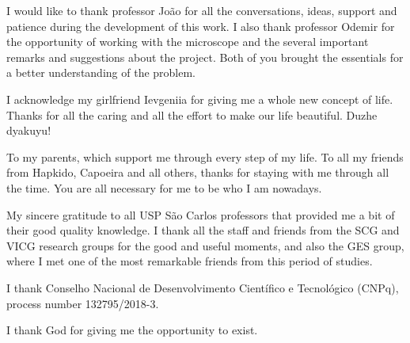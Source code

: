 I would like to thank professor João for all the conversations, ideas, support and patience during the development of this work. I also thank professor Odemir for the opportunity of working with the microscope and the several important remarks and suggestions about the project. Both of you brought the essentials for a better understanding of the problem.

I acknowledge my girlfriend Ievgeniia for giving me a whole new concept of life. Thanks for all the caring and all the effort to make our life beautiful. Duzhe dyakuyu!

To my parents, which support me through every step of my life. To all my friends from Hapkido, Capoeira and all others, thanks for staying with me through all the time. You are all necessary for me to be who I am nowadays.

My sincere gratitude to all USP São Carlos professors that provided me a bit of their good quality knowledge. I thank all the staff and friends from the SCG and VICG research groups for the good and useful moments, and also the GES group, where I met one of the most remarkable friends from this period of studies.

I thank Conselho Nacional de Desenvolvimento Científico e Tecnológico (CNPq), process number 132795/2018-3.	

I thank God for giving me the opportunity to exist.